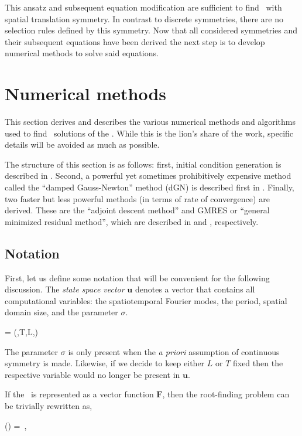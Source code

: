 This ansatz and subsequent equation modification are sufficient to find \twots\ with
spatial translation symmetry. In contrast to discrete symmetries, there are no selection rules
defined by this symmetry.
Now that all considered symmetries and their subsequent equations have been derived the next step
is to develop numerical methods to solve said equations.

\section{Numerical methods}
\label{section:methods}
This section derives and describes the various numerical methods and algorithms used
to find \twot\ solutions of the \KSe{}. While this is the lion's share of the work, specific details
will be avoided as much as possible.

The structure of this section is as follows: first, initial condition generation is described
in . Second, a powerful yet sometimes prohibitively expensive
method called the ``damped Gauss-Newton'' method (dGN)
is described first in .
Finally, two faster but less powerful methods (in terms of rate of convergence) are derived.
These are the ``adjoint descent method'' and GMRES or ``general minimized residual method'',
which are described in  and , respectively.


\subsection{Notation}
First, let us define some notation that will be convenient for the following discussion.
The \emph{state space vector} $\mathbf{u}$ denotes a vector that contains all computational variables:
the spatiotemporal Fourier modes, the period, spatial domain size,
and the  parameter $\sigma$.

\beq
{} = (\Fuvec,T,L,\sigma{}) \,
\eeq

The parameter $\sigma$ is only present when the \textit{a priori}
assumption of continuous symmetry is made.
Likewise, if we decide to keep either $L$ or $T$ fixed then the respective variable
would no longer be present in $\mathbf{u}$.

If the \KSe\ is represented as a vector function $\mathbf{F}$, then the
root-finding problem can be trivially rewritten as,

\beq
{}() =  \,,
\eeq

